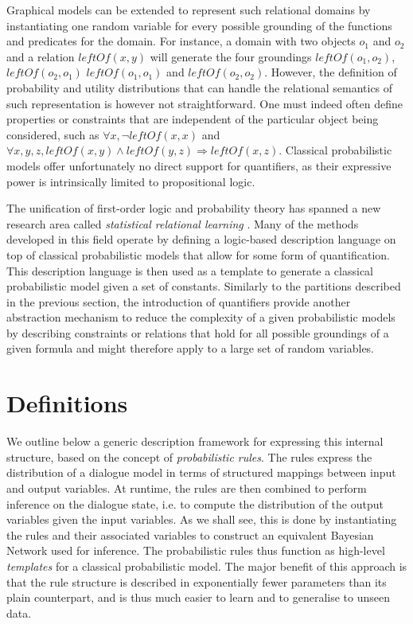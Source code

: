 Graphical models can be extended to represent such relational domains by instantiating one random variable for every possible grounding of the functions and predicates for the domain.  For instance, a domain with two objects $o_1$ and $o_2$ and a relation $\mathit{leftOf}(x,y)$ will generate the four groundings $\mathit{leftOf}(o_1,o_2)$, $\mathit{leftOf}(o_2,o_1)$ $\mathit{leftOf}(o_1,o_1)$ and $\mathit{leftOf}(o_2,o_2)$. However, the definition of probability and utility distributions that can handle the relational semantics of such representation is however not straightforward.  One must indeed often define properties or constraints that are independent of the particular object being considered, such as $\forall x, \neg \mathit{leftOf}(x,x)$ and $\forall x, y, z, \mathit{leftOf}(x,y) \land \mathit{leftOf}(y,z) \Rightarrow \mathit{leftOf}(x,z)$. Classical probabilistic models offer unfortunately no direct support for quantifiers, as their expressive power is intrinsically limited to propositional logic. 

The unification of first-order logic and probability theory has spanned a new research area called \textit{statistical relational learning} \citep{getoor:srlbook07}. Many of the methods developed in this field operate by defining a logic-based description language on top of classical probabilistic models that allow for some form of quantification. This description language is then used as a template to generate a classical probabilistic model given a set of constants. Similarly to the partitions described in the previous section, the introduction of quantifiers provide another abstraction mechanism to reduce the complexity of a given probabilistic models by describing constraints or relations that hold for all possible groundings of a given formula and might therefore apply to a large set of random variables. 

\section{Definitions}

We outline below a generic description framework for expressing this internal structure, based on the concept of \textit{probabilistic rules}.  The rules express the distribution of a dialogue model in terms of structured mappings between input and output variables.  At runtime, the rules are then combined to perform inference on the dialogue state, i.e. to compute the distribution of the output variables given the input variables. As we shall see, this is done by instantiating the rules and their associated variables to construct an equivalent Bayesian Network used for inference.  The probabilistic rules thus function as high-level \textit{templates} for a classical probabilistic model.  The major benefit of this approach is that the rule structure is described in exponentially fewer parameters than its plain counterpart, and is thus much easier to learn and to generalise to unseen data.  


